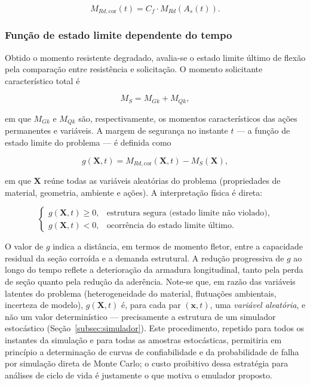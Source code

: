 \begin{equation}\label{eq:m_res}
M_{Rd,\mathrm{cor}}(t) = C_f \cdot M_{Rd}\!\left(A_{s}(t)\right).
\end{equation}

\subsubsection{Fun\c{c}\~ao de estado limite dependente do tempo}
\label{subsec:funcao_g}

Obtido o momento resistente degradado, avalia-se o estado limite último de flexão pela comparação entre resistência e solicitação. O momento solicitante característico total é

\begin{equation}\label{eq:ms}
M_S = M_{Gk} + M_{Qk},
\end{equation}

\noindent em que $M_{Gk}$ e $M_{Qk}$ são, respectivamente, os momentos característicos das ações permanentes e variáveis. A margem de segurança no instante $t$ --- a função de estado limite do problema --- é definida como

\begin{equation}\label{eq:funcao_g}
g(\mathbf{X}, t) = M_{Rd,\mathrm{cor}}(\mathbf{X}, t) - M_S(\mathbf{X}),
\end{equation}

\noindent em que $\mathbf{X}$ reúne todas as variáveis aleatórias do problema (propriedades de material, geometria, ambiente e ações). A interpretação física é direta:

\begin{equation}\label{eq:dominio_falha}
\begin{cases}
g(\mathbf{X}, t) \geq 0, & \text{estrutura segura (estado limite não violado)}, \\[4pt]
g(\mathbf{X}, t) < 0,  & \text{ocorrência do estado limite último}.
\end{cases}
\end{equation}

O valor de $g$ indica a distância, em termos de momento fletor, entre a capacidade residual da seção corroída e a demanda estrutural. A redução progressiva de $g$ ao longo do tempo reflete a deterioração da armadura longitudinal, tanto pela perda de seção quanto pela redução da aderência. Note-se que, em razão das variáveis latentes do problema (heterogeneidade do material, flutuações ambientais, incerteza de modelo), $g(\mathbf{X}, t)$ é, para cada par $(\mathbf{x}, t)$, uma \textit{variável aleatória}, e não um valor determinístico --- precisamente a estrutura de um simulador estocástico (Seção~\ref{subsec:simulador}). Este procedimento, repetido para todos os instantes da simulação e para todas as amostras estocásticas, permitiria em princípio a determinação de curvas de confiabilidade e da probabilidade de falha por simulação direta de Monte Carlo; o custo proibitivo dessa estratégia para análises de ciclo de vida é justamente o que motiva o emulador proposto.

